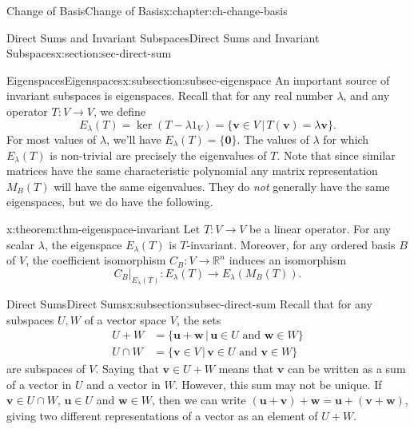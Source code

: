 \documentclass[oneside,10pt,]{book}
\numberwithin{equation}{section}
\newcommand{\R}{\mathbb{R}}
\newcommand{\uu}{\mathbf{u}}
\newcommand{\vv}{\mathbf{v}}
\newcommand{\ww}{\mathbf{w}}
\newcommand{\amp}{&}
\begin{document}
\begin{chapterptx}{Change of Basis}{}{Change of Basis}{}{}{x:chapter:ch-change-basis}
\begin{sectionptx}{Direct Sums and Invariant Subspaces}{}{Direct Sums and Invariant Subspaces}{}{}{x:section:sec-direct-sum}
\typeout{************************************************}
%
\begin{subsectionptx}{Eigenspaces}{}{Eigenspaces}{}{}{x:subsection:subsec-eigenspace}
An important source of invariant subspaces is eigenspaces. Recall that for any real number \(\lambda\), and any operator \(T:V\to V\), we define%
\begin{equation*}
E_\lambda(T) = \ker(T-\lambda 1_V) = \{\vv\in V \,|\, T(\vv) = \lambda\vv\}\text{.}
\end{equation*}
For most values of \(\lambda\), we'll have \(E_\lambda(T)=\{\mathbf{0}\}\). The values of \(\lambda\) for which \(E_\lambda(T)\) is non-trivial are precisely the eigenvalues of \(T\). Note that since similar matrices have the same characteristic polynomial any matrix representation \(M_B(T)\) will have the same eigenvalues. They do \emph{not} generally have the same eigenspaces, but we do have the following.%
\begin{theorem}{}{}{x:theorem:thm-eigenspace-invariant}%
Let \(T:V\to V\) be a linear operator. For any scalar \(\lambda\), the eigenspace \(E_\lambda(T)\) is \(T\)-invariant. Moreover, for any ordered basis \(B\) of \(V\), the coefficient isomorphism \(C_B:V\to \R^n\) induces an isomorphism%
\begin{equation*}
C_B|_{E_\lambda(T)}:E_\lambda(T)\to E_{\lambda}(M_B(T))\text{.}
\end{equation*}
%
\end{theorem}
\end{subsectionptx}
%
%
\typeout{************************************************}
\typeout{************************************************}
%
\begin{subsectionptx}{Direct Sums}{}{Direct Sums}{}{}{x:subsection:subsec-direct-sum}
Recall that for any subspaces \(U,W\) of a vector space \(V\), the sets%
\begin{align*}
U+W \amp =\{\uu+\ww \,|\, \uu\in U \text{ and } \ww\in W\}\\
U\cap W \amp = \{\vv \in V \,|\, \vv\in U \text{ and } \vv\in W\}
\end{align*}
are subspaces of \(V\). Saying that \(\vv\in U+W\) means that \(\vv\) can be written as a sum of a vector in \(U\) and a vector in \(W\). However, this sum may not be unique. If \(\vv\in U\cap W\), \(\uu\in U\) and \(\ww\in W\), then we can write \((\uu+\vv)+\ww = \uu + (\vv+\ww)\), giving two different representations of a vector as an element of \(U+W\).%

\end{subsectionptx}
\end{sectionptx}
\end{chapterptx}
\end{document}
